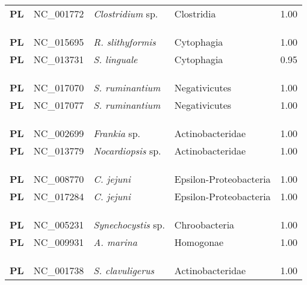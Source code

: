 \begin{adjustwidth}{-3cm}{2cm}
{\begin{supertabular}{>{\bfseries}l|p{0.1\textwidth}p{0.14\textwidth}l|l}
PL & NC\_001772 & \textit{Clostridium} sp. & Clostridia & 1.00\\
\\
\\
\hline\\
PL & NC\_015695 & \textit{R. slithyformis} & Cytophagia & 1.00\\
PL & NC\_013731 & \textit{S. linguale} & Cytophagia & 0.95\\
\\
\\
\hline\\
PL & NC\_017070 & \textit{S. ruminantium} & Negativicutes & 1.00\\
PL & NC\_017077 & \textit{S. ruminantium} & Negativicutes & 1.00\\
\\
\\
\hline\\
PL & NC\_002699 & \textit{Frankia} sp. & Actinobacteridae & 1.00\\
PL & NC\_013779 & \textit{Nocardiopsis} sp. & Actinobacteridae & 1.00\\
\\
\\
\hline\\
PL & NC\_008770 & \textit{C. jejuni} & Epsilon-Proteobacteria & 1.00\\
PL & NC\_017284 & \textit{C. jejuni} & Epsilon-Proteobacteria & 1.00\\
\\
\\
\hline\\
PL & NC\_005231 & \textit{Synechocystis} sp. & Chroobacteria & 1.00\\
PL & NC\_009931 & \textit{A. marina} & Homogonae & 1.00\\
\\
\\
\hline\\
PL & NC\_001738 & \textit{S. clavuligerus} & Actinobacteridae & 1.00\\

\end{supertabular}}
\end{adjustwidth}
